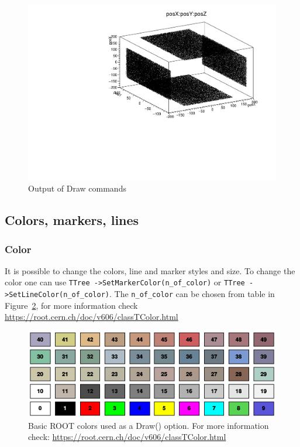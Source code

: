 \documentclass[12pt]{article}
\begin{document}
\begin{figure}[h]
\includegraphics[scale=0.37]{figs/3Dhist.pdf}
\caption{Output of Draw commands}
\label{fig:1Dhist}
\end{figure}
\clearpage

\subsection{Colors, markers, lines}
\subsubsection{Color}
It is possible to change the colors, line and marker styles and size.
To change the color one can use \verb|TTree ->SetMarkerColor(n_of_color)| or \verb|TTree ->SetLineColor(n_of_color)|. The \verb|n_of_color| can be chosen from table in Figure~\ref{fig:root_colors}, for more information check\\ \href{https://root.cern.ch/doc/v606/classTColor.html}{https://root.cern.ch/doc/v606/classTColor.html}  %

\begin{figure}[h]
\centering
\includegraphics[scale=0.5]{figs/root_colors.png}
\caption{Basic ROOT colors used as a Draw() option. For more information check: \href{https://root.cern.ch/doc/v606/classTColor.html}{https://root.cern.ch/doc/v606/classTColor.html} }
\label{fig:root_colors}
\end{figure}
\end{document}
